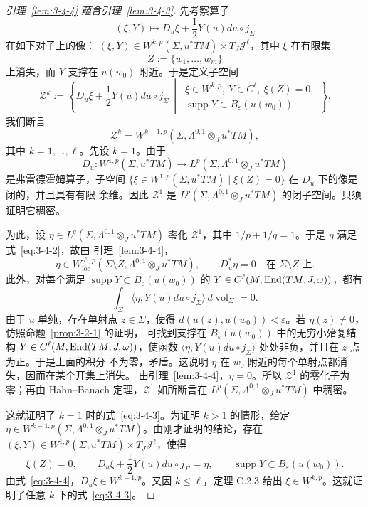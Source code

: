 \begin{proof}[引理~\ref{lem:3-4-4} 蕴含引理~\ref{lem:3-4-3}]
先考察算子
\[
  (\xi,Y)\longmapsto D_u\xi+\frac12Y(u)du\circ j_\Sigma
\]
在如下对子上的像：
$ (\xi,Y)\in W^{k,p}(\Sigma,u^*TM)\times T_J\mathcal J^\ell$，其中 $\xi$ 在有限集
\[
  Z:=\{w_1,\ldots,w_m\}
\]
上消失，而 $Y$ 支撑在 $u(w_0)$ 附近。于是定义子空间
\[
  \mathcal Z^k:=
  \left\{
    D_u\xi+\frac12Y(u)du\circ j_\Sigma
    \ \middle|\,
    \begin{array}{l}
      \xi\in W^{k,p},\ Y\in C^\ell,\ \xi(Z)=0,\\
      \operatorname{supp}Y\subset B_\varepsilon(u(w_0))
    \end{array}
  \right\}.
\]
我们断言
\begin{equation}\label{eq:3-4-3}
  \mathcal Z^k=W^{k-1,p}
  (\Sigma,\Lambda^{0,1}\otimes_Ju^*TM),
\end{equation}
其中 $k=1,\ldots,\ell$。先设 $k=1$。由于
\[
  D_u:W^{1,p}(\Sigma,u^*TM)
  \longrightarrow L^p(\Sigma,\Lambda^{0,1}\otimes_Ju^*TM)
\]
是弗雷德霍姆算子，子空间
$\{\xi\in W^{1,p}(\Sigma,u^*TM)\mid\xi(Z)=0\}$ 在 $D_u$ 下的像是闭的，并且具有有限
余维。因此 $\mathcal Z^1$ 是
$L^p(\Sigma,\Lambda^{0,1}\otimes_Ju^*TM)$ 的闭子空间。只须证明它稠密。

为此，设 $\eta\in L^q(\Sigma,\Lambda^{0,1}\otimes_Ju^*TM)$ 零化
$\mathcal Z^1$，其中 $1/p+1/q=1$。于是 $\eta$ 满足式~\eqref{eq:3-4-2}，故由
引理~\ref{lem:3-4-4}，
\[
  \eta\in W_{\mathrm{loc}}^{\ell,p}
  (\Sigma\setminus Z,\Lambda^{0,1}\otimes_Ju^*TM),
  \qquad
  D_u^*\eta=0\quad\text{在 }\Sigma\setminus Z\text{ 上}.
\]
此外，对每个满足
$\operatorname{supp}Y\subset B_\varepsilon(u(w_0))$ 的
$Y\in C^\ell(M,\operatorname{End}(TM,J,\omega))$，都有
\[
  \int_\Sigma\langle\eta,Y(u)du\circ j_\Sigma\rangle\,
  d\operatorname{vol}_\Sigma=0.
\]
由于 $u$ 单纯，存在单射点 $z\in\Sigma$，使得
$d(u(z),u(w_0))<\varepsilon$。若 $\eta(z)\ne0$，仿照命题~\ref{prop:3-2-1} 的证明，
可找到支撑在 $B_\varepsilon(u(w_0))$ 中的无穷小殆复结构
$Y\in C^\ell(M,\operatorname{End}(TM,J,\omega))$，使函数
$\langle\eta,Y(u)du\circ j_\Sigma\rangle$ 处处非负，并且在 $z$ 点为正。于是上面的积分
不为零，矛盾。这说明 $\eta$ 在 $w_0$ 附近的每个单射点都消失，因而在某个开集上消失。
由引理~\ref{lem:3-4-4}，$\eta=0$。所以 $\mathcal Z^1$ 的零化子为零；再由
Hahn--Banach 定理，$\mathcal Z^1$ 如所断言在
$L^p(\Sigma,\Lambda^{0,1}\otimes_Ju^*TM)$ 中稠密。

这就证明了 $k=1$ 时的式~\eqref{eq:3-4-3}。为证明 $k>1$ 的情形，给定
$\eta\in W^{k-1,p}(\Sigma,\Lambda^{0,1}\otimes_Ju^*TM)$。由刚才证明的结论，存在
$(\xi,Y)\in W^{1,p}(\Sigma,u^*TM)\times T_J\mathcal J^\ell$，使得
\begin{equation}\label{eq:3-4-4}
  \xi(Z)=0,\qquad
  D_u\xi+\frac12Y(u)du\circ j_\Sigma=\eta,\qquad
  \operatorname{supp}Y\subset B_\varepsilon(u(w_0)).
\end{equation}
由式~\eqref{eq:3-4-4}，$D_u\xi\in W^{k-1,p}$。又因 $k\le\ell$，定理 C.2.3
给出 $\xi\in W^{k,p}$。这就证明了任意 $k$ 下的式~\eqref{eq:3-4-3}。


\end{proof}
